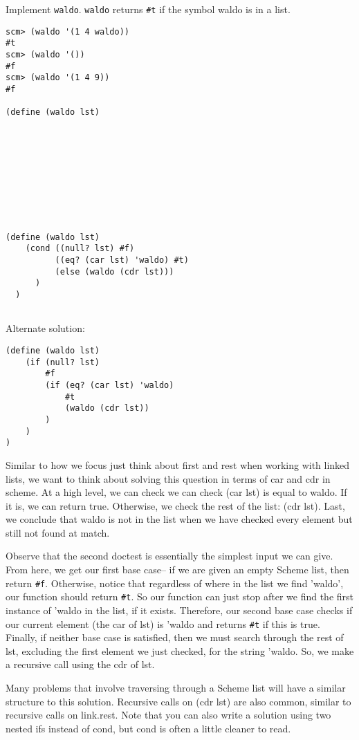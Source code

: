 \begin{blocksection}
\question Implement \texttt{waldo}. \texttt{waldo} returns \texttt{\#t} if the
symbol waldo is in a list. \\

\begin{lstlisting}
scm> (waldo '(1 4 waldo))
#t
scm> (waldo '())
#f
scm> (waldo '(1 4 9))
#f

(define (waldo lst)










\end{lstlisting}
\end{blocksection}
\begin{blocksection}
\begin{solution}[0.5in]

\begin{lstlisting}
(define (waldo lst)
    (cond ((null? lst) #f)
          ((eq? (car lst) 'waldo) #t)
          (else (waldo (cdr lst)))
      )
  )


\end{lstlisting}
Alternate solution:
\begin{lstlisting}
(define (waldo lst)
    (if (null? lst)
        #f
        (if (eq? (car lst) 'waldo)
            #t
            (waldo (cdr lst))
        )
    )
)
\end{lstlisting}
Similar to how we focus just think about  first and rest when working with linked lists, we want to think about solving this question in terms of car and cdr in scheme. At a high level, we can check we can check (car lst) is equal to waldo. If it is, we can return true. Otherwise, we check the rest of the list: (cdr lst). Last, we conclude that waldo is not in the list when we have checked every element but still not found at match.

Observe that the second doctest is essentially the simplest input we can give. From here, we get our first base case-- if we are given an empty Scheme list, then return \texttt{\#f}. Otherwise, notice that regardless of where in the list we find 'waldo', our function should return \texttt{\#t}. So our function can just stop after we find the first instance of 'waldo in the list, if it exists. Therefore, our second base case checks if our current element (the car of lst) is 'waldo and returns \texttt{\#t} if this is true. Finally, if neither base case is satisfied, then we must search through the rest of lst, excluding the first element we just checked, for the string 'waldo. So, we make a recursive call using the cdr of lst.

Many problems that involve traversing through a Scheme list will have a similar structure to this solution. Recursive calls on (cdr lst) are also common, similar to recursive calls on link.rest.  Note that you can also write a solution using two nested ifs instead of cond, but cond is often a little cleaner to read.


\end{solution}
\end{blocksection}

